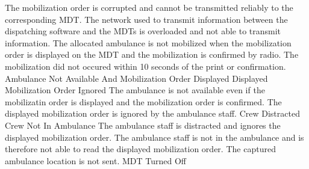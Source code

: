 	 {The mobilization order is corrupted and cannot be transmitted reliably to the corresponding MDT.}
\stopkaosspec
\startkaosspec
	 {The network used to transmit information between the dispatching software and the MDTs is overloaded and not able to transmit information.}
\stopkaosspec
\startkaosspec
	 {The allocated ambulance is not mobilized when the mobilization order is displayed on the MDT and the mobilization is confirmed by radio. The mobilization did not occured within 10 seconds of the print or confirmation.}
	 {Ambulance Not Available And Mobilization Order Displayed}
	 {Displayed Mobilization Order Ignored}
\stopkaosspec
\startkaosspec
	 {The ambulance is not available even if the mobilizatin order is displayed and the mobilization order is confirmed.}
\stopkaosspec
\startkaosspec
	 {The displayed mobilization order is ignored by the ambulance staff.}
	 {Crew Distracted}
	 {Crew Not In Ambulance}
\stopkaosspec
\startkaosspec
	 {The ambulance staff is distracted and ignores the displayed mobilization order.}
\stopkaosspec
\startkaosspec
	 {The ambulance staff is not in the ambulance and is therefore not able to read the displayed mobilization order.}
\stopkaosspec
\startkaosspec
	 {The captured ambulance location is not sent.}
	 {MDT Turned Off}
\stopkaosspec


\stopsubsection
